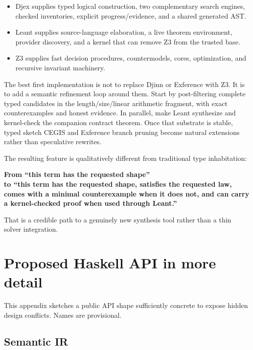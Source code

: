\documentclass[11pt,oneside]{article}
\begin{document}
\begin{itemize}
  \item Djex supplies typed logical construction, two complementary search engines,
        checked inventories, explicit progress/evidence, and a shared generated AST.
  \item Leant supplies source-language elaboration, a live theorem environment,
        provider discovery, and a kernel that can remove Z3 from the trusted base.
  \item Z3 supplies fast decision procedures, countermodels, cores, optimization, and
        recursive invariant machinery.
\end{itemize}

The best first implementation is not to replace Djinn or Exference with Z3. It is to
add a semantic refinement loop around them. Start by post-filtering complete typed
candidates in the length/size/linear arithmetic fragment, with exact counterexamples
and honest evidence. In parallel, make Leant synthesize and kernel-check the companion
contract theorem. Once that substrate is stable, typed sketch CEGIS and Exference
branch pruning become natural extensions rather than speculative rewrites.

The resulting feature is qualitatively different from traditional type inhabitation:

\begin{center}
\begin{minipage}{0.86\textwidth}
\centering\sffamily\bfseries\large
From ``this term has the requested shape''\\[2mm]
to ``this term has the requested shape, satisfies the requested law, comes with a
minimal counterexample when it does not, and can carry a kernel-checked proof when used
through Leant.''
\end{minipage}
\end{center}

That is a credible path to a genuinely new synthesis tool rather than a thin solver
integration.


\appendix

\section{Proposed Haskell API in more detail}
\label{app:api}

This appendix sketches a public API shape sufficiently concrete to expose hidden design
conflicts. Names are provisional.

\subsection{Semantic IR}
\end{document}
